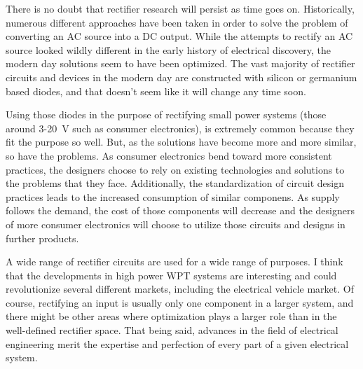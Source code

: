
There is no doubt that rectifier research will persist
as time goes on. Historically, numerous different approaches
have been taken in order to solve the problem of converting
an AC source into a DC output. While the attempts to
rectify an AC source looked wildly different in the
early history of electrical discovery, the modern day
solutions seem to have been optimized. The vast majority of
rectifier circuits and devices in the modern day
are constructed with silicon or germanium based diodes,
and that doesn't seem like it will change any time soon.

Using those diodes in the purpose of rectifying small
power systems (those around 3-20~V such as consumer
electronics), is extremely common because they fit the
purpose so well. But, as the solutions have become more
and more similar, so have the problems. As consumer
electronics bend toward more consistent practices, the
designers choose to rely on existing technologies and
solutions to the problems that they face. Additionally,
the standardization of circuit design practices leads
to the increased consumption of similar componens. As
supply follows the demand, the cost of those components
will decrease and the designers of more consumer electronics
will choose to utilize those circuits and designs in
further products.

A wide range of rectifier circuits are used for a wide
range of purposes. I think that the developments in
high power WPT systems are interesting and could revolutionize
several different markets, including the electrical vehicle
market. Of course, rectifying an input is usually
only one component in a larger system, and there
might be other areas where optimization plays a larger
role than in the well-defined rectifier space. That being
said, advances in the field of electrical engineering
merit the expertise and perfection of every part of
a given electrical system.
